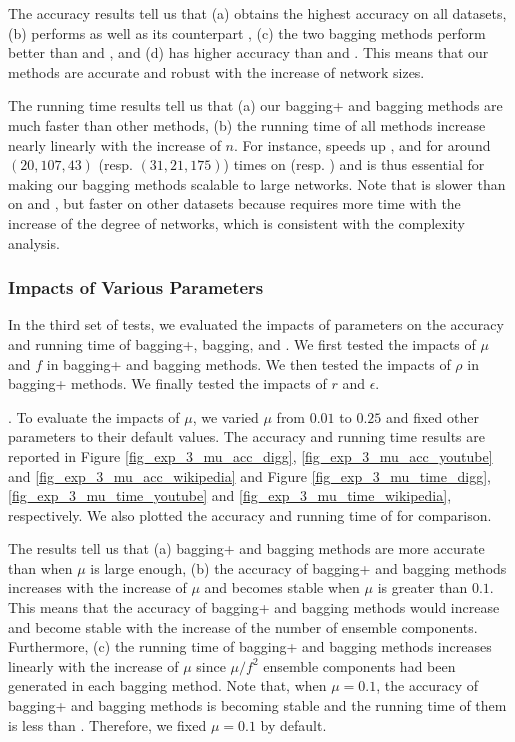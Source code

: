 The accuracy results tell us that (a) \Biased obtains the highest accuracy on all
datasets, (b) \Biasedp performs as well as its counterpart \Biased,
(c) the two bagging methods perform better than \Aa and \BIGCLAM,
and (d) \NMF has higher accuracy than \Aa and \BIGCLAM. This means that
our methods are accurate and robust with the increase of network sizes.

The running time results tell us that (a) our bagging+ and bagging methods are much faster than other methods,
(b) the running time of all methods increase nearly linearly with the increase of $n$. For
instance, \Biasedp speeds up \NMF, \Aa and \BIGCLAM for around $(20, 107, 43)$ (resp. $(31, 21, 175)$)
times on \Twitter (resp. \Friendster) and is thus essential for
making our bagging methods scalable to large networks. Note
that \NMF is slower than \BIGCLAM on \Digg and \YouTube,
but faster on other datasets because \BIGCLAM requires more time with
the increase of the degree of networks, which is consistent with the complexity analysis.






\subsubsection{Impacts of Various Parameters}
In the third set of tests, we evaluated the impacts of parameters on
the accuracy and running time of bagging+, bagging, \NMF
and \BIGCLAM. We first tested the impacts of $\mu$ and $f$ in bagging+ and bagging methods.
We then tested the impacts of $\rho$ in bagging+ methods. We finally
tested the impacts of $r$ and $\epsilon$.


. To evaluate the impacts of $\mu$, we
varied $\mu$ from $0.01$ to $0.25$ and fixed other parameters to their
default values. The accuracy and running time results are reported in
Figure \ref{fig_exp_3_mu_acc_digg}, \ref{fig_exp_3_mu_acc_youtube} and
\ref{fig_exp_3_mu_acc_wikipedia} and Figure \ref{fig_exp_3_mu_time_digg},
\ref{fig_exp_3_mu_time_youtube} and \ref{fig_exp_3_mu_time_wikipedia},
respectively. We also plotted the accuracy and running time of \NMF for comparison.



The results tell us that (a) bagging+ and bagging methods are more accurate than
\NMF when $\mu$ is large enough, (b) the accuracy of bagging+ and bagging methods
increases with the increase of $\mu$ and becomes stable when $\mu$ is greater
than $0.1$. This means that the accuracy of bagging+ and bagging methods would
increase and become stable with the increase of the number of ensemble components.
Furthermore, (c) the running time of bagging+ and bagging methods increases linearly
with the increase of $\mu$ since $\mu / f^2$ ensemble components had been generated in each bagging
method. Note that, when $\mu = 0.1$, the accuracy of bagging+ and bagging methods
is becoming stable and the running time of them is less than \NMF.
Therefore, we fixed $\mu = 0.1$ by default.


